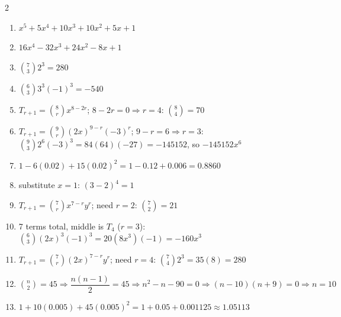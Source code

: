 \documentclass[11pt]{article}
\begin{document}
\begin{keybox}
\begin{multicols}{2}
\small
\begin{enumerate}[leftmargin=*,itemsep=3pt]
  \item $x^5+5x^4+10x^3+10x^2+5x+1$
  \item $16x^4-32x^3+24x^2-8x+1$
  \item $\binom73 2^3=280$
  \item $\binom63 3^3(-1)^3=-540$
  \item $T_{r+1}=\binom8r x^{8-2r}$; $8-2r=0\Rightarrow r=4$: $\binom84=70$
  \item $T_{r+1}=\binom9r(2x)^{9-r}(-3)^r$; $9-r=6\Rightarrow r=3$: $\binom93 2^6(-3)^3=84(64)(-27)=-145152$, so $-145152x^6$
  \item $1-6(0.02)+15(0.02)^2=1-0.12+0.006=0.8860$
  \item substitute $x=1$: $(3-2)^4=1$
  \item $T_{r+1}=\binom7r x^{7-r}y^r$; need $r=2$: $\binom72=21$
  \item 7 terms total, middle is $T_4$ ($r=3$): $\binom63(2x)^3(-1)^3=20(8x^3)(-1)=-160x^3$
  \item $T_{r+1}=\binom7r(2x)^{7-r}y^r$; need $r=4$: $\binom74 2^3 = 35(8)=280$
  \item $\binom n2=45\Rightarrow\dfrac{n(n-1)}{2}=45\Rightarrow n^2-n-90=0\Rightarrow(n-10)(n+9)=0\Rightarrow n=10$
  \item $1+10(0.005)+45(0.005)^2=1+0.05+0.001125\approx1.05113$
\end{enumerate}
\end{multicols}
\end{keybox}
\end{document}
